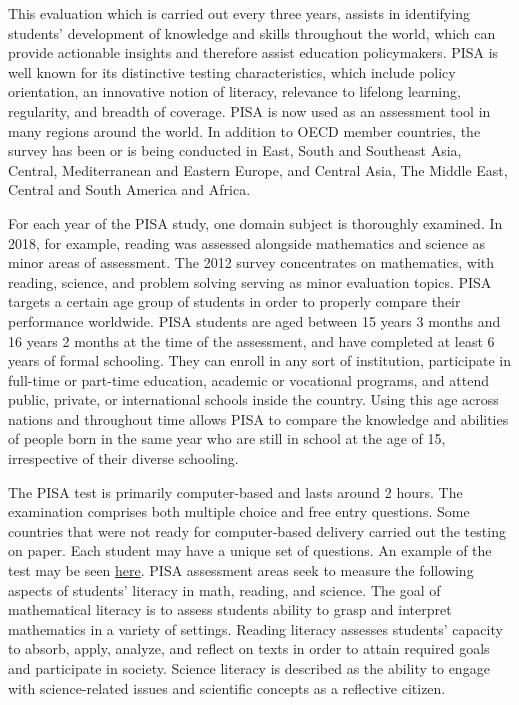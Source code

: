 This evaluation which is carried out every three years, assists in
identifying students' development of knowledge and skills throughout the
world, which can provide actionable insights and therefore assist
education policymakers. PISA is well known for its distinctive testing
characteristics, which include policy orientation, an innovative notion
of literacy, relevance to lifelong learning, regularity, and breadth of
coverage. PISA is now used as an assessment tool in many regions around
the world. In addition to OECD member countries, the survey has been or
is being conducted in East, South and Southeast Asia, Central,
Mediterranean and Eastern Europe, and Central Asia, The Middle East,
Central and South America and Africa.

For each year of the PISA study, one domain subject is thoroughly
examined. In 2018, for example, reading was assessed alongside
mathematics and science as minor areas of assessment. The 2012 survey
concentrates on mathematics, with reading, science, and problem solving
serving as minor evaluation topics. PISA targets a certain age group of
students in order to properly compare their performance worldwide. PISA
students are aged between 15 years 3 months and 16 years 2 months at the
time of the assessment, and have completed at least 6 years of formal
schooling. They can enroll in any sort of institution, participate in
full-time or part-time education, academic or vocational programs, and
attend public, private, or international schools inside the country.
Using this age across nations and throughout time allows PISA to compare
the knowledge and abilities of people born in the same year who are
still in school at the age of 15, irrespective of their diverse
schooling.

The PISA test is primarily computer-based and lasts around 2 hours. The
examination comprises both multiple choice and free entry questions.
Some countries that were not ready for computer-based delivery carried
out the testing on paper. Each student may have a unique set of
questions. An example of the test may be seen
\href{https://www.oecd.org/pisa/test/}{here}. PISA assessment areas seek
to measure the following aspects of students' literacy in math, reading,
and science. The goal of mathematical literacy is to assess students
ability to grasp and interpret mathematics in a variety of settings.
Reading literacy assesses students' capacity to absorb, apply, analyze,
and reflect on texts in order to attain required goals and participate
in society. Science literacy is described as the ability to engage with
science-related issues and scientific concepts as a reflective citizen.

